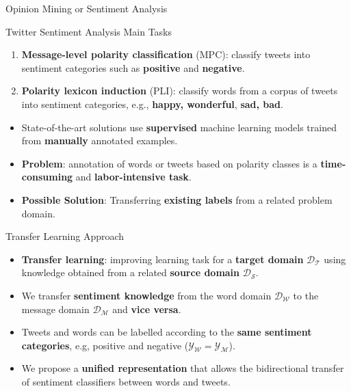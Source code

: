 \documentclass[handout]{beamer}
\begin{document}
\begin{frame}{Opinion Mining or Sentiment Analysis}
\begin{scriptsize}

\begin{block}{Twitter Sentiment Analysis Main Tasks}
\begin{enumerate}
\item  \textbf{Message-level polarity classification} (MPC): classify tweets into sentiment categories such as \textcolor[rgb]{0.00,0.00,1.00}{\textbf{positive}} and \textcolor[rgb]{1.00,0.00,0.00}{\textbf{negative}}.
\item \textbf{Polarity lexicon induction} (PLI): classify words from a corpus of tweets into sentiment categories, e.g.,  \textcolor[rgb]{0.00,0.00,1.00}{\textbf{happy, wonderful}}, \textcolor[rgb]{1.00,0.00,0.00}{\textbf{sad, bad}}.
\end{enumerate}
\end{block}

\begin{itemize}
\item  State-of-the-art solutions use \textbf{supervised} machine learning models trained from \textbf{manually} annotated examples.
\item \textbf{Problem}: annotation of words or tweets based on polarity classes is a \textbf{time-consuming} and \textbf{labor-intensive task}. 
\item \textbf{Possible Solution}: Transferring \textbf{existing labels} from a related problem domain.
\end{itemize}



 
\end{scriptsize}

\end{frame}





\begin{frame}{Transfer Learning Approach}
\begin{scriptsize}
\begin{itemize}
\item \textbf{Transfer learning}: improving learning task for a \textbf{target domain} $\mathcal{D_T}$ using knowledge obtained from a related \textbf{source domain} $\mathcal{D_S}$.
\item We transfer \textbf{sentiment knowledge} from the word domain  $\mathcal{D_W}$  to the message domain $\mathcal{D_M}$ and \textbf{vice versa}.
\item Tweets and words can be labelled according to the \textbf{same sentiment categories}, e.g, positive and negative ($\mathcal{Y_W}=\mathcal{Y_M}$).
\item We propose a \textbf{unified representation} that allows the bidirectional transfer of sentiment classifiers between words and tweets. 

\end{itemize}
\end{scriptsize}
\end{frame}
\end{document}
